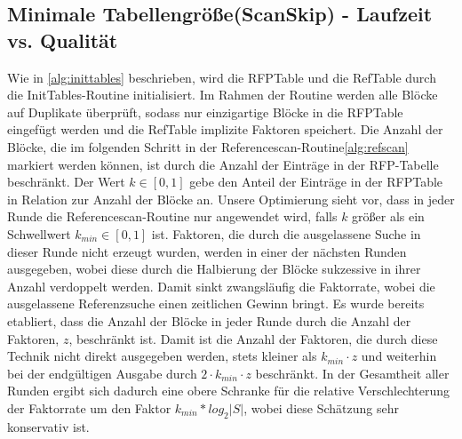 \subsection{Minimale Tabellengröße(ScanSkip) - Laufzeit vs. Qualität}
Wie in \ref{alg:inittables} beschrieben, wird die RFPTable und die RefTable durch die InitTables-Routine initialisiert. Im Rahmen der Routine werden alle Blöcke auf Duplikate
überprüft, sodass nur einzigartige Blöcke in die RFPTable eingefügt werden und die RefTable implizite Faktoren speichert. Die Anzahl der Blöcke, die im folgenden Schritt 
in der Referencescan-Routine\ref{alg:refscan} markiert werden können, ist durch die Anzahl der Einträge in der RFP-Tabelle beschränkt. Der Wert $k\in [0,1]$ gebe den Anteil der
Einträge in der RFPTable in Relation zur Anzahl der Blöcke an. Unsere Optimierung sieht vor, dass in jeder Runde die Referencescan-Routine nur angewendet wird, falls $k$ größer
als ein Schwellwert $k_{min}\in [0,1]$ ist. Faktoren, die durch die ausgelassene Suche in dieser Runde nicht erzeugt wurden, werden in einer der nächsten Runden ausgegeben, wobei diese
durch die Halbierung der Blöcke sukzessive in ihrer Anzahl verdoppelt werden. Damit sinkt zwangsläufig die Faktorrate, wobei die ausgelassene Referenzsuche einen zeitlichen Gewinn bringt.
Es wurde bereits etabliert, dass die Anzahl der Blöcke in jeder Runde durch die Anzahl der Faktoren, $z$, beschränkt ist. Damit ist die Anzahl der Faktoren, die durch diese Technik nicht
direkt ausgegeben werden, stets kleiner als $k_{min} \cdot z$ und weiterhin bei der endgültigen Ausgabe durch $2 \cdot k_{min} \cdot z$ beschränkt. In der Gesamtheit aller Runden ergibt 
sich dadurch eine obere Schranke für die relative Verschlechterung der Faktorrate um den Faktor $k_{min} * {log_2{|S|}}$, wobei diese Schätzung sehr konservativ ist.